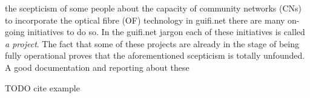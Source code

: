  the scepticism of some people about the capacity of community networks (CNs) to incorporate the optical fibre (OF) technology in guifi.net there are many on-going initiatives to do so. In the guifi.net jargon each of these initiatives is called \emph{a project}. The fact that some of these projects are already in the stage of being fully operational proves that the aforementioned scepticism is totally unfounded. A good documentation and reporting about these 

TODO cite example~\cite{barcelo2012bub}


%
